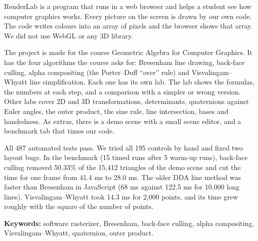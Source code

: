 RenderLab is a program that runs in a web browser and helps a student see how computer graphics works. Every picture on the screen is drawn by our own code. The code writes colours into an array of pixels and the browser shows that array. We did not use WebGL or any 3D library.

The project is made for the course Geometric Algebra for Computer Graphics. It has the four algorithms the course asks for: Bresenham line drawing, back-face culling, alpha compositing (the Porter--Duff ``over'' rule) and Visvalingam--Whyatt line simplification. Each one has its own lab. The lab shows the formulas, the numbers at each step, and a comparison with a simpler or wrong version. Other labs cover 2D and 3D transformations, determinants, quaternions against Euler angles, the outer product, the sine rule, line intersection, bases and handedness. As extras, there is a demo scene with a small scene editor, and a benchmark tab that times our code.

All 487 automated tests pass. We tried all 195 controls by hand and fixed two layout bugs. In the benchmark (15 timed runs after 5 warm-up runs), back-face culling removed 50.33\% of the 15,412 triangles of the demo scene and cut the time for one frame from 41.4 ms to 28.0 ms. The older DDA line method was faster than Bresenham in JavaScript (68 ms against 122.5 ms for 10,000 long lines). Visvalingam--Whyatt took 14.3 ms for 2,000 points, and its time grew roughly with the square of the number of points.

\vspace{6pt}
\noindent\textbf{Keywords:} software rasterizer, Bresenham, back-face culling, alpha compositing, Visvalingam--Whyatt, quaternion, outer product.
